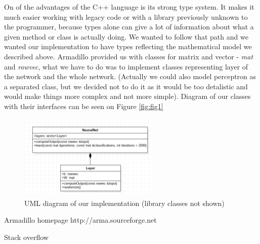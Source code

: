 \documentclass[3p,twocolumn]{elsarticle}
\begin{document}
On of the advantages of the C++ language is its strong type system. It makes it much easier working with legacy code or with a library previously unknown to the programmer, because types alone can give a lot of information about what a given method or class is actually doing. We wanted to follow that path and we wanted our implementation to have types reflecting the mathematical model we described above. Armadillo provided us with classes for matrix and vector - \emph{mat} and \emph{rowvec}, what we have to do was to implement classes representing layer of the network and the whole network. (Actually we could also model perceptron as a separated class, but we decided not to do it as it would be too detalistic and would make things more complex and not more simple). Diagram of our classes with their interfaces can be seen on Figure \ref{fig:fig1}

\begin{figure}[fig2]
	
\label{fig:fig3}
  \includegraphics[width=0.60\textwidth]{uml-diagram.png}
	\caption{UML diagram of our implementation (library classes not shown)}
	\label{fig3}
\end{figure}


%

 \begin{thebibliography}{00}

%

  Armadillo homepage http://arma.sourceforge.net
 
  Stack overflow

 \end{thebibliography}
\end{document}
